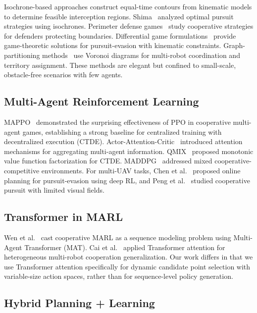 \documentclass[10pt,conference]{IEEEtran}
\begin{document}
Isochrone-based approaches construct equal-time contours from kinematic models to determine feasible interception regions. Shima~\cite{shima2011optimal} analyzed optimal pursuit strategies using isochrones. Perimeter defense games~\cite{perimeter1,perimeter2} study cooperative strategies for defenders protecting boundaries. Differential game formulations~\cite{tad2018,homicidal2015} provide game-theoretic solutions for pursuit-evasion with kinematic constraints. Graph-partitioning methods~\cite{voronoi_multirobot,voronoi_pursuit} use Voronoi diagrams for multi-robot coordination and territory assignment. These methods are elegant but confined to small-scale, obstacle-free scenarios with few agents.

\subsection{Multi-Agent Reinforcement Learning}

MAPPO~\cite{yu2022surprising} demonstrated the surprising effectiveness of PPO in cooperative multi-agent games, establishing a strong baseline for centralized training with decentralized execution (CTDE). Actor-Attention-Critic~\cite{iqbal2019actor} introduced attention mechanisms for aggregating multi-agent information. QMIX~\cite{rashid2018qmix} proposed monotonic value function factorization for CTDE. MADDPG~\cite{lowe2017multi} addressed mixed cooperative-competitive environments. For multi-UAV tasks, Chen et al.~\cite{chen2025online} proposed online planning for pursuit-evasion using deep RL, and Peng et al.~\cite{peng2025multi} studied cooperative pursuit with limited visual fields.

\subsection{Transformer in MARL}

Wen et al.~\cite{wen2022mat} cast cooperative MARL as a sequence modeling problem using Multi-Agent Transformer (MAT). Cai et al.~\cite{cai2024transformer} applied Transformer attention for heterogeneous multi-robot cooperation generalization. Our work differs in that we use Transformer attention specifically for dynamic candidate point selection with variable-size action spaces, rather than for sequence-level policy generation.

\subsection{Hybrid Planning + Learning}
\end{document}
